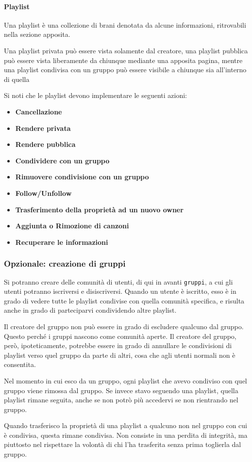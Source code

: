 \paragraph{Playlist} Una playlist è una collezione di brani denotata da alcune informazioni, ritrovabili nella sezione apposita.

Una playlist privata può essere vista solamente dal creatore, una playlist pubblica può essere vista liberamente da chiunque mediante una apposita pagina, mentre una playlist condivisa con un gruppo può essere visibile a chiunque sia all'interno di quella 

Si noti che le playlist devono implementare le seguenti azioni:\begin{itemize}
    \item \textbf{Cancellazione}
    \item \textbf{Rendere privata}
    \item \textbf{Rendere pubblica}
    \item \textbf{Condividere con un gruppo}
    \item \textbf{Rimuovere condivisione con un gruppo}
    \item \textbf{Follow/Unfollow}
    \item \textbf{Trasferimento della proprietà ad un nuovo owner}
    \item \textbf{Aggiunta o Rimozione di canzoni}
    \item \textbf{Recuperare le informazioni}
\end{itemize}
\subsubsection{Opzionale: creazione di gruppi}
Si potranno creare delle comunità di utenti, di qui in avanti \verb|gruppi|, a cui gli utenti potranno iscriversi e disiscriversi. Quando un utente è iscritto, esso è in grado di vedere tutte le playlist condivise con quella comunità specifica, e risulta anche in grado di parteciparvi condividendo altre playlist.

Il creatore del gruppo non può essere in grado di escludere qualcuno dal gruppo. Questo perché i gruppi nascono come comunità aperte. Il creatore del gruppo, però, ipoteticamente, potrebbe essere in grado di annullare le condivisioni di playlist verso quel gruppo da parte di altri, cosa che agli utenti normali non è consentita.

\alert{Nel momento in cui esco da un gruppo, ogni playlist che avevo condiviso con quel gruppo viene rimossa dal gruppo. Se invece stavo seguendo una playlist, quella playlist rimane seguita, anche se non potrò più accedervi se non rientrando nel gruppo.}

\alert{Quando trasferisco la proprietà di una playlist a qualcuno non nel gruppo con cui è condivisa, questa rimane condivisa. Non consiste in una perdita di integrità, ma piuttosto nel rispettare la volontà di chi l'ha trasferita senza prima toglierla dal gruppo.}
\newpage